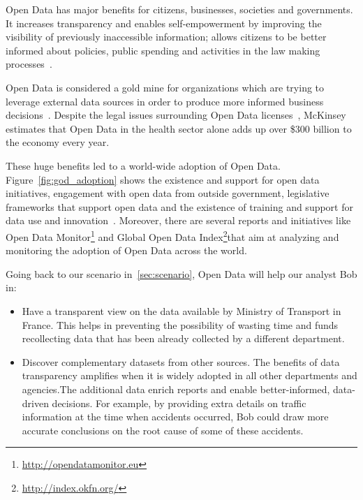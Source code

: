 Open Data has major benefits for citizens, businesses, societies and governments. It increases transparency and enables self-empowerment by improving the visibility of previously inaccessible information; allows citizens to be better informed about policies, public spending and activities in the law making processes~\cite{Deloitte:Report:12, Manyika:Report:13}.

Open Data is considered a gold mine for organizations which are trying to leverage external data sources in order to produce more informed business decisions~\cite{Boyd:Article:11}. Despite the legal issues surrounding Open Data licenses~\cite{Prateek:Misc:13}, McKinsey~\cite{Manyika:Report:13} estimates that Open Data in the health sector alone adds up over \$300 billion to the economy every year.

These huge benefits led to a world-wide adoption of Open Data. Figure~\ref{fig:god_adoption} shows the existence and support for open data initiatives, engagement with open data from outside government, legislative frameworks that support open data and the existence of training and support for data use and innovation~\cite{Davies:Report:15}.
Moreover, there are several reports and initiatives like Open Data Monitor\footnote{\url{http://opendatamonitor.eu}} and Global Open Data Index\footnote{\url{http://index.okfn.org/}}that aim at analyzing and monitoring the adoption of Open Data across the world.

Going back to our scenario in~\ref{sec:scenario}, Open Data will help our analyst Bob in:

\begin{itemize}
	\item Have a transparent view on the data available by Ministry of Transport in France. This helps in preventing the possibility of wasting time and funds recollecting data that has been already collected by a different department.
	\item Discover complementary datasets from other sources. The benefits of data transparency amplifies when it is widely adopted in all other departments and agencies.The additional data enrich reports and enable better-informed, data-driven decisions. For example, by providing extra details on traffic information at the time when accidents occurred, Bob could draw more accurate conclusions on the root cause of some of these accidents.
\end{itemize}

\begin{figure}[ht!]
\end{figure}

